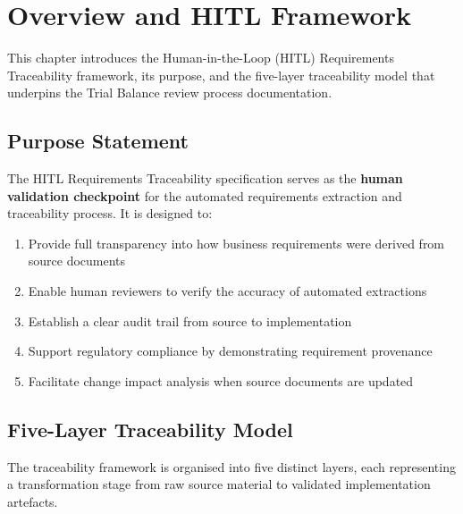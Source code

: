 \chapter{Overview and HITL Framework}
\label{ch:overview}

This chapter introduces the Human-in-the-Loop (HITL) Requirements
Traceability framework, its purpose, and the five-layer traceability
model that underpins the Trial Balance review process documentation.

\section{Purpose Statement}
\label{sec:purpose}

The HITL Requirements Traceability specification serves as the
\textbf{human validation checkpoint} for the automated requirements
extraction and traceability process. It is designed to:

\begin{enumerate}
  \item Provide full transparency into how business requirements were
        derived from source documents
  \item Enable human reviewers to verify the accuracy of automated
        extractions
  \item Establish a clear audit trail from source to implementation
  \item Support regulatory compliance by demonstrating requirement
        provenance
  \item Facilitate change impact analysis when source documents are
        updated
\end{enumerate}

\section{Five-Layer Traceability Model}
\label{sec:five-layer-model}

The traceability framework is organised into five distinct layers,
each representing a transformation stage from raw source material
to validated implementation artefacts.

